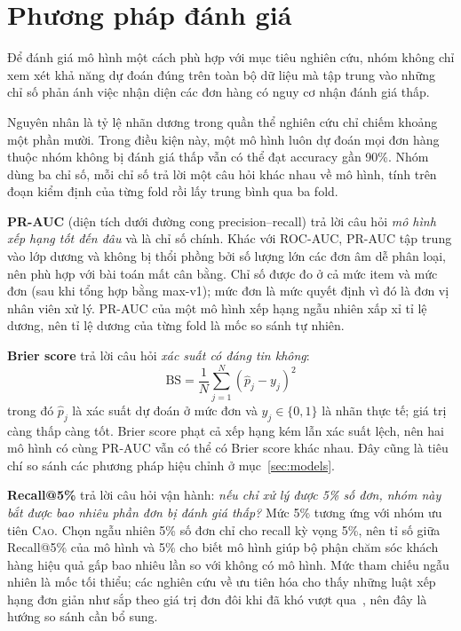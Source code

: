 \documentclass[12pt,a4paper]{report}
\begin{document}
\section{Phương pháp đánh giá}\label{sec:eval}

Để đánh giá mô hình một cách phù hợp với mục tiêu nghiên cứu, nhóm không chỉ xem xét khả năng dự đoán đúng trên toàn bộ dữ liệu mà tập trung vào những chỉ số phản ánh việc nhận diện các đơn hàng có nguy cơ nhận đánh giá thấp.

Nguyên nhân là tỷ lệ nhãn dương trong quần thể nghiên cứu chỉ chiếm khoảng một phần mười. Trong điều kiện này, một mô hình luôn dự đoán mọi đơn hàng thuộc nhóm không bị đánh giá thấp vẫn có thể đạt accuracy gần 90\%. Nhóm dùng ba chỉ số, mỗi chỉ số trả lời một câu hỏi khác nhau về mô hình, tính trên đoạn kiểm định của từng fold rồi lấy trung bình qua ba fold.

\textbf{PR-AUC} (diện tích dưới đường cong precision--recall) trả lời câu hỏi \emph{mô hình xếp hạng tốt đến đâu} và là chỉ số chính. Khác với ROC-AUC, PR-AUC tập trung vào lớp dương và không bị thổi phồng bởi số lượng lớn các đơn âm dễ phân loại, nên phù hợp với bài toán mất cân bằng. Chỉ số được đo ở cả mức item và mức đơn (sau khi tổng hợp bằng max-v1); mức đơn là mức quyết định vì đó là đơn vị nhân viên xử lý. PR-AUC của một mô hình xếp hạng ngẫu nhiên xấp xỉ tỉ lệ dương, nên tỉ lệ dương của từng fold là mốc so sánh tự nhiên.

\textbf{Brier score} trả lời câu hỏi \emph{xác suất có đáng tin không}:
\begin{equation}\label{eq:brier}
  \mathrm{BS} = \frac{1}{N}\sum_{j=1}^{N}\left(\hat{p}_j - y_j\right)^2
\end{equation}
trong đó $\hat p_j$ là xác suất dự đoán ở mức đơn và $y_j \in \{0,1\}$ là nhãn thực tế; giá trị càng thấp càng tốt. Brier score phạt cả xếp hạng kém lẫn xác suất lệch, nên hai mô hình có cùng PR-AUC vẫn có thể có Brier score khác nhau. Đây cũng là tiêu chí so sánh các phương pháp hiệu chỉnh ở mục~\ref{sec:models}.

\textbf{Recall@5\%} trả lời câu hỏi vận hành: \emph{nếu chỉ xử lý được 5\% số đơn, nhóm này bắt được bao nhiêu phần đơn bị đánh giá thấp?} Mức 5\% tương ứng với nhóm ưu tiên \textsc{Cao}. Chọn ngẫu nhiên 5\% số đơn chỉ cho recall kỳ vọng 5\%, nên tỉ số giữa Recall@5\% của mô hình và 5\% cho biết mô hình giúp bộ phận chăm sóc khách hàng hiệu quả gấp bao nhiêu lần so với không có mô hình. Mức tham chiếu ngẫu nhiên là mốc tối thiểu; các nghiên cứu về ưu tiên hóa cho thấy những luật xếp hạng đơn giản như sắp theo giá trị đơn đôi khi đã khó vượt qua~\cite{li2026valuesorting}, nên đây là hướng so sánh cần bổ sung.
\end{document}
